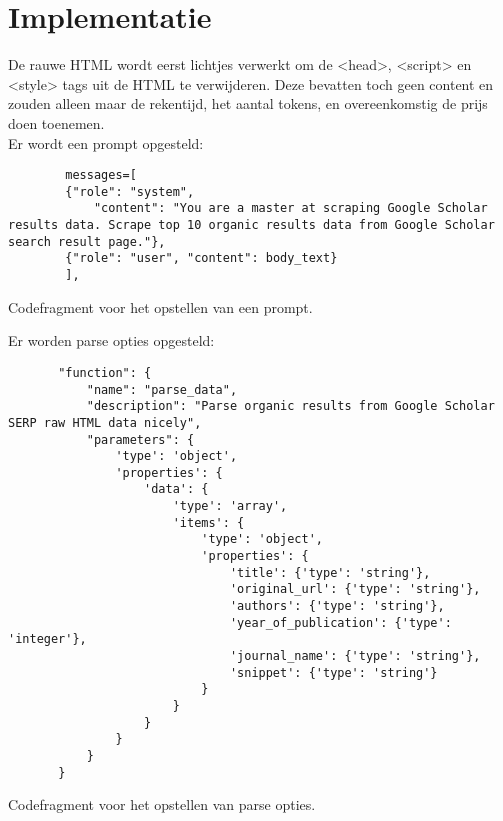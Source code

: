 \section{Implementatie}
De rauwe HTML wordt eerst lichtjes verwerkt om de <head>, <script> en <style> tags uit de HTML te verwijderen. Deze bevatten toch geen content en zouden alleen maar de rekentijd, het aantal tokens, en overeenkomstig de prijs doen toenemen.\\
Er wordt een prompt opgesteld:
\begin{listing}
    \begin{verbatim}
        messages=[
        {"role": "system",
            "content": "You are a master at scraping Google Scholar results data. Scrape top 10 organic results data from Google Scholar search result page."},
        {"role": "user", "content": body_text}
        ],
    \end{verbatim}
    \caption[Prompt codefragment]{Codefragment voor het opstellen van een prompt.}
    \label{code:Prompt codefragment}
\end{listing}
Er worden parse opties opgesteld:
\begin{listing}
    \begin{verbatim}
       "function": {
           "name": "parse_data",
           "description": "Parse organic results from Google Scholar SERP raw HTML data nicely",
           "parameters": {
               'type': 'object',
               'properties': {
                   'data': {
                       'type': 'array',
                       'items': {
                           'type': 'object',
                           'properties': {
                               'title': {'type': 'string'},
                               'original_url': {'type': 'string'},
                               'authors': {'type': 'string'},
                               'year_of_publication': {'type': 'integer'},
                               'journal_name': {'type': 'string'},
                               'snippet': {'type': 'string'}
                           }
                       }
                   }
               }
           }
       }
    \end{verbatim}
    \caption[Parse opties codefragment]{Codefragment voor het opstellen van parse opties.}
    \label{code:Parse opties codefragment}
\end{listing}

